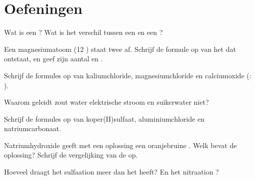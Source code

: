 \section{Oefeningen}

\begin{exercise}[$\star$]\label{exo:g9:ions:1}
Wat is een ? Wat is het verschil tussen een  en een ?
\end{exercise}

\begin{exercise}[$\star$]\label{exo:g9:ions:2}
Een magnesiumatoom (12 ) staat twee  af. Schrijf de
formule op van het  dat ontstaat, en geef zijn aantal  en
.
\end{exercise}

\begin{exercise}[$\star$]\label{exo:g9:ions:3}
Schrijf de formules op van kaliumchloride, magnesiumchloride en
calciumoxide (: ).
\end{exercise}

\begin{exercise}[$\star$]\label{exo:g9:ions:4}
Waarom geleidt zout water elektrische stroom en suikerwater niet?
\end{exercise}

\begin{exercise}[$\star\star$]\label{exo:g9:ions:5}
Schrijf de formules op van koper(II)sulfaat, aluminiumchloride en
natriumcarbonaat.
\end{exercise}

\begin{exercise}[$\star\star$]\label{exo:g9:ions:6}
Natriumhydroxide geeft met een oplossing een oranjebruine .
Welk  bevat de oplossing? Schrijf de vergelijking van de
 op.
\end{exercise}

\begin{exercise}[$\star\star$]\label{exo:g9:ions:7}
Hoeveel  draagt het sulfaation  meer dan het
 heeft? En het nitraation ?
\end{exercise}


